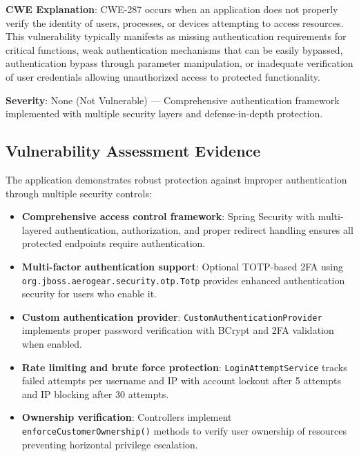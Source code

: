 \documentclass[]{UCD_CS_FYP_Report}
\begin{document}
\textbf{CWE Explanation}: CWE-287 occurs when an application does not properly verify the identity of users, processes, or devices attempting to access resources. This vulnerability typically manifests as missing authentication requirements for critical functions, weak authentication mechanisms that can be easily bypassed, authentication bypass through parameter manipulation, or inadequate verification of user credentials allowing unauthorized access to protected functionality.

\textbf{Severity}: None (Not Vulnerable) — Comprehensive authentication framework implemented with multiple security layers and defense-in-depth protection.

\subsection{Vulnerability Assessment Evidence}
The application demonstrates robust protection against improper authentication through multiple security controls:
\begin{itemize}
	\item \textbf{Comprehensive access control framework}: Spring Security with multi-layered authentication, authorization, and proper redirect handling ensures all protected endpoints require authentication.
	\item \textbf{Multi-factor authentication support}: Optional TOTP-based 2FA using \texttt{org.jboss.aerogear.security.otp.Totp} provides enhanced authentication security for users who enable it.
	\item \textbf{Custom authentication provider}: \texttt{CustomAuthenticationProvider} implements proper password verification with BCrypt and 2FA validation when enabled.
	\item \textbf{Rate limiting and brute force protection}: \texttt{LoginAttemptService} tracks failed attempts per username and IP with account lockout after 5 attempts and IP blocking after 30 attempts.
	\item \textbf{Ownership verification}: Controllers implement \texttt{enforceCustomerOwnership()} methods to verify user ownership of resources preventing horizontal privilege escalation.
\end{itemize}
\end{document}
